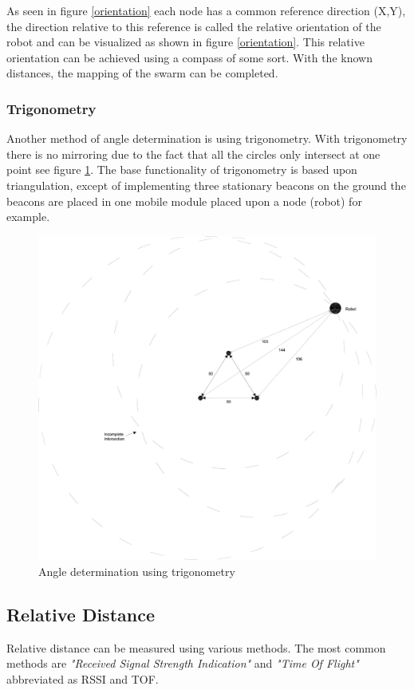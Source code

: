 \documentclass[10pt,a4paper]{article}
\begin{document}
As seen in figure \ref{orientation} each node has a common reference direction (X,Y), the direction relative to this reference is called the relative orientation of the robot and can be visualized as shown in figure \ref{orientation}. This relative orientation can be achieved using a compass of some sort. With the known distances, the mapping of the swarm can be completed.
\newpage

\subsubsection{Trigonometry}
Another method of angle determination is using trigonometry. With trigonometry there is no mirroring due to the fact that all the circles only intersect at one point see figure \ref{trigonometry}. The base functionality of trigonometry is based upon triangulation, except of implementing three stationary beacons on the ground the beacons are placed in one mobile module placed upon a node (robot) for example.

\begin{figure}[H]
\centering
\includegraphics[width=1\textwidth]{trigonometry.pdf}
\caption{Angle determination using trigonometry}
\label{trigonometry}
\end{figure}
\newpage

\subsection{Relative Distance}
Relative distance can be measured using various methods. The most common methods are \textit{"Received Signal Strength Indication"} and \textit{"Time Of Flight"} abbreviated as RSSI and TOF. 
\end{document}
